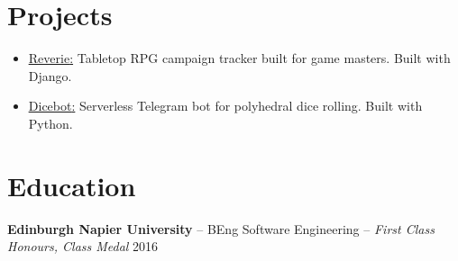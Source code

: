 \documentclass[11pt]{article}       %
\begin{document}
\vspace{-6.5pt}

\section*{Projects}
\begin{itemize}
  \item \underline{\href{https://github.com/oneirism/reverie}{Reverie}:} Tabletop RPG campaign tracker built for game masters. Built with Django.
  \item \underline{\href{https://github.com/oneirism/dicebot}{Dicebot}:} Serverless Telegram bot for polyhedral dice rolling. Built with Python.
\end{itemize}

\vspace{-18.5pt}

\section*{Education}
\textbf{Edinburgh Napier University} -- BEng Software Engineering -- \textit{First Class Honours, Class Medal} \hfill 2016 \\

\vspace{-6.5pt}

\printbibliography[title=Citations]
\end{document}

